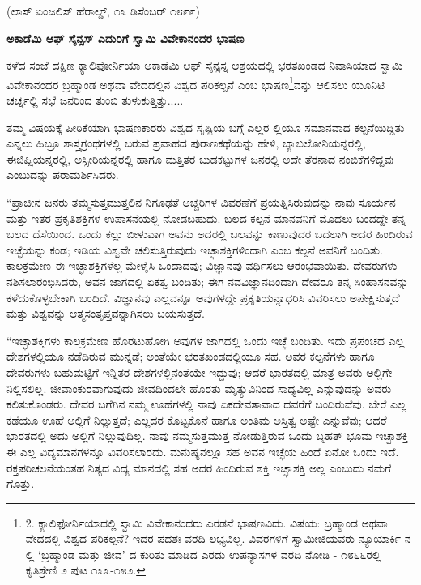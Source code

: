 \begin{center}
(ಲಾಸ್ ಏಂಜಲಿಸ್ ಹೆರಾಲ್ಡ್, ೧೩ ಡಿಸೆಂಬರ್ ೧೮೯೯)
\end{center}

\begin{center}
\textbf{ಅಕಾಡೆಮಿ ಆಫ್ ಸೈನ್ಸಸ್ ಎದುರಿಗೆ ಸ್ವಾಮಿ ವಿವೇಕಾನಂದರ ಭಾಷಣ}
\end{center}

ಕಳೆದ ಸಂಜೆ ದಕ್ಷಿಣ ಕ್ಯಾಲಿಫೋರ್ನಿಯಾ ಅಕಾಡೆಮಿ ಆಫ್ ಸೈನ್ಸಸ್ನ ಆಶ್ರಯದಲ್ಲಿ ಭರತಖಂಡದ ನಿವಾಸಿಯಾದ ಸ್ವಾಮಿ ವಿವೇಕಾನಂದರ ಬ್ರಹ್ಮಾಂಡ ಅಥವಾ ವೇದದಲ್ಲಿನ ವಿಶ್ವದ ಪರಿಕಲ್ಪನೆ ಎಂಬ ಭಾಷಣ\footnote{2. ಕ್ಯಾಲಿಫೋರ್ನಿಯಾದಲ್ಲಿ ಸ್ವಾಮಿ ವಿವೇಕಾನಂದರು ಎರಡನೆ ಭಾಷಣವಿದು. ವಿಷಯ: ಬ್ರಹ್ಮಾಂಡ ಅಥವಾ ವೇದದಲ್ಲಿ ವಿಶ್ವದ ಪರಿಕಲ್ಪನೆ? ಇದರ ಪದಶಃ ವರದಿ ಲಭ್ಯವಿಲ್ಲ. ವಿವರಗಳಿಗೆ ಸ್ವಾಮೀಜಿಯವರು ನ್ಯೂಯಾರ್ಕಿ ನ ಲ್ಲಿ ‘ಬ್ರಹ್ಮಾಂಡ ಮತ್ತು ಜೀವ’ ದ ಕುರಿತು ಮಾಡಿದ ಎರಡು ಉಪನ್ಯಾಸಗಳ ವರದಿ ನೋಡಿ - ೧೮೬೬ರಲ್ಲಿ ಕೃತಿಶ್ರೇಣಿ ೨ ಪುಟ ೧೩೩-೧೫೨.}ವನ್ನು ಆಲಿಸಲು ಯೂನಿಟಿ ಚರ್ಚ್ನಲ್ಲಿ ಸಭೆ ಜನರಿಂದ ತುಂಬಿ ತುಳುಕುತ್ತಿತ್ತು.....

ತಮ್ಮ ವಿಷಯಕ್ಕೆ ಪೀಠಿಕೆಯಾಗಿ ಭಾಷಣಕಾರರು ವಿಶ್ವದ ಸೃಷ್ಟಿಯ ಬಗ್ಗೆ ಎಲ್ಲರ ಲ್ಲಿಯೂ ಸಮಾನವಾದ ಕಲ್ಪನೆಯಿದ್ದಿತು ಎನ್ನಲು ಹಿಬ್ರೂ ಶಾಸ್ತ್ರಗ್ರಂಥಗಳಲ್ಲಿ ಬರುವ ಪ್ರವಾಹದ ಪುರಾಣಕಥೆಯನ್ನು ಹೇಳಿ, ಬ್ಯಾಬಿಲೋನಿಯನ್ನರಲ್ಲಿ, ಈಜಿಪ್ಷಿಯನ್ನರಲ್ಲಿ, ಅಸ್ಸೀರಿಯನ್ನರಲ್ಲಿ ಹಾಗೂ ಮತ್ತಿತರ ಬುಡಕಟ್ಟುಗಳ ಜನರಲ್ಲಿ ಅದೇ ತೆರನಾದ ನಂಬಿಕೆಗಳಿದ್ದವು ಎಂಬುದನ್ನು ಪರಾಮರ್ಶಿಸಿದರು.

“ಪ್ರಾಚೀನ ಜನರು ತಮ್ಮಸುತ್ತಮುತ್ತಲಿನ ನಿಗೂಢತೆ ಅಚ್ಚರಿಗಳ ವಿವರಣೆಗೆ ಪ್ರಯತ್ನಿಸಿರುವುದನ್ನು ನಾವು ಸೂರ್ಯನ ಮತ್ತು ಇತರ ಪ್ರಕೃತಿಶಕ್ತಿಗಳ ಉಪಾಸನೆಯಲ್ಲಿ ನೋಡಬಹುದು. ಬಲದ ಕಲ್ಪನೆ ಮಾನವನಿಗೆ ಮೊದಲು ಬಂದದ್ದೇ ತನ್ನ ಬಲದ ದೆಸೆಯಿಂದ. ಒಂದು ಕಲ್ಲು ಬೀಳುವಾಗ ಅವನು ಅದರಲ್ಲಿ ಬಲವನ್ನು ಕಾಣುವುದರ ಬದಲಾಗಿ ಅದರ ಹಿಂದಿರುವ ಇಚ್ಛೆಯನ್ನು ಕಂಡ; ಇಡಿಯ ವಿಶ್ವವೇ ಚಲಿಸುತ್ತಿರುವುದು ಇಚ್ಛಾಶಕ್ತಿಗಳಿಂದಾಗಿ ಎಂಬ ಕಲ್ಪನೆ ಅವನಿಗೆ ಬಂದಿತು. ಕಾಲಕ್ರಮೇಣ ಈ ಇಚ್ಛಾಶಕ್ತಿಗಳೆಲ್ಲ ಮೇಳೈಸಿ ಒಂದಾದವು; ವಿಜ್ಞಾನವು ವರ್ಧಿಸಲು ಆರಂಭವಾಯಿತು. ದೇವರುಗಳು ನಶಿಸಲಾರಂಭಿಸಿದರು, ಅವನ ಜಾಗದಲ್ಲಿ ಏಕತ್ವ ಬಂದಿತು; ಈಗ ನವವಿಜ್ಞಾನದಿಂದಾಗಿ ದೇವರೂ ತನ್ನ ಸಿಂಹಾಸನವನ್ನು ಕಳೆದುಕೊಳ್ಳಬೇಕಾಗಿ ಬಂದಿದೆ. ವಿಜ್ಞಾನವು ಎಲ್ಲವನ್ನೂ ಅವುಗಳದ್ದೇ ಪ್ರಕೃತಿಯನ್ನಾಧರಿಸಿ ವಿವರಿಸಲು ಅಪೇಕ್ಷಿಸುತ್ತದೆ ಮತ್ತು ವಿಶ್ವವನ್ನು ಆತ್ಮಸಂತೃಪ್ತವನ್ನಾಗಿಸಲು ಬಯಸುತ್ತದೆ.

“ಇಚ್ಛಾಶಕ್ತಿಗಳು ಕಾಲಕ್ರಮೇಣ ಹೊರಟುಹೋಗಿ ಅವುಗಳ ಜಾಗದಲ್ಲಿ ಒಂದು ಇಚ್ಛೆ ಬಂದಿತು. ಇದು ಪ್ರಪಂಚದ ಎಲ್ಲ ದೇಶಗಳಲ್ಲಿಯೂ ನಡೆದಿರುವ ಮುನ್ನಡೆ; ಅಂತೆಯೇ ಭರತಖಂಡದಲ್ಲಿಯೂ ಸಹ. ಅವರ ಕಲ್ಪನೆಗಳು ಹಾಗೂ ದೇವರುಗಳು ಬಹುಮಟ್ಟಿಗೆ ಇನ್ನಿತರ ದೇಶಗಳಲ್ಲಿನಂತೆಯೇ ಇದ್ದುವು; ಆದರೆ ಭಾರತದಲ್ಲಿ ಮಾತ್ರ ಅವರು ಅಲ್ಲಿಗೇ ನಿಲ್ಲಿಸಲಿಲ್ಲ. ಜೀವಾಂಕುರವಾಗುವುದು ಜೀವದಿಂದಲೇ ಹೊರತು ಮೃತ್ಯುವಿನಿಂದ ಸಾಧ್ಯವಿಲ್ಲ ಎನ್ನುವುದನ್ನು ಅವರು ಕಲಿತುಕೊಂಡರು. ದೇವರ ಬಗೆಗಿನ ನಮ್ಮ ಊಹೆಗಳಲ್ಲಿ ನಾವು ಏಕದೇವತಾವಾದ ದವರೆಗೆ ಬಂದಿರುವೆವು. ಬೇರೆ ಎಲ್ಲ ಕಡೆಯೂ ಊಹೆ ಅಲ್ಲಿಗೆ ನಿಲ್ಲುತ್ತದೆ; ಎಲ್ಲದರ ಕೊಟ್ಟಕೊನೆ ಹಾಗೂ ಅಂತಿಮ ಅಸ್ತಿತ್ವ ಅಷ್ಟೇ ಎನ್ನುವೆವು; ಆದರೆ ಭಾರತದಲ್ಲಿ ಅದು ಅಲ್ಲಿಗೆ ನಿಲ್ಲುವುದಿಲ್ಲ. ನಾವು ನಮ್ಮಸುತ್ತಮುತ್ತ ನೋಡುತ್ತಿರುವ ಒಂದು ಬೃಹತ್ ಭೂಮ ಇಚ್ಛಾಶಕ್ತಿ ಈ ಎಲ್ಲ ವಿದ್ಯಮಾನಗಳನ್ನೂ ವಿವರಿಸಲಾರದು. ಮನುಷ್ಯನಲ್ಲೂ ಸಹ ಅವನ ಇಚ್ಛೆಯ ಹಿಂದೆ ಏನೋ ಒಂದು ಇದೆ. ರಕ್ತಪರಿಚಲನೆಯಂತಹ ನಿತ್ಯದ ವಿದ್ಯ ಮಾನದಲ್ಲಿ ಸಹ ಅದರ ಹಿಂದಿರುವ ಶಕ್ತಿ ಇಚ್ಛಾಶಕ್ತಿ ಅಲ್ಲ ಎಂಬುದು ನಮಗೆ ಗೊತ್ತು.


